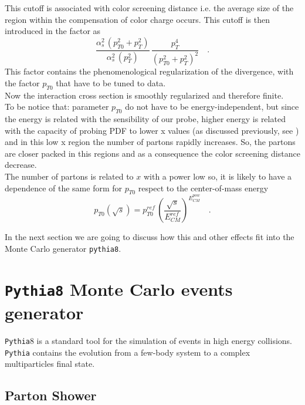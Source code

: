 \noindent This cutoff is associated with color screening distance i.e. the average size of the region within the  compensation of color charge occurs.
This cutoff is then introduced in the factor as
\begin{equation}
	\frac{\alpha_s^2\,(p_{T0}^2+p_{T}^2)}{\alpha_s^2\,(p_T^2)}\,\frac{p_T^4}{(p_{T0}^2+p_T^2)^2}\quad .
\end{equation}
This factor contains the phenomenological regularization of the divergence, with the factor $p_{T0}$ that have to be tuned to data. 
\\
Now the interaction cross section is smoothly regularized and therefore finite.
\\
To be notice that: parameter $p_{T0}$ do not have to be energy-independent, but since the energy is related with the sensibility of our probe, higher energy is related with the capacity of probing PDF to lower x values (as discussed previously, see ) and in this low x region the number of partons rapidly increases. So, the partons are closer packed in this regions and as a consequence the color screening distance decrease.
\\
The number of partons is related to $x$ with a power low so, it is likely to have a dependence of the same form for $p_{T0}$ respect to the center-of-mass energy
\begin{equation}
	p_{T0}(\sqrt{s})=p_{T0}^{ref} \,\left( \frac{\sqrt{s}}{E_{CM}^{ref}} \right)^{E_{CM}^{pow}}\quad .
\end{equation}
	
	
In the next section we are going to discuss how this and other effects fit into the Monte Carlo generator \texttt{pythia8}.	
	
\section{\texttt{Pythia8} Monte Carlo events generator}	

\texttt{Pythia}8 is a standard tool for the simulation of events in high energy collisions. \texttt{Pythia} contains the evolution from a few-body system to a complex multiparticles final state.

\subsection{Parton Shower}

